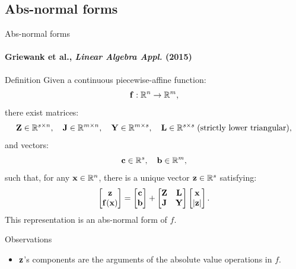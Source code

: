 \documentclass[10pt]{beamer}
\begin{document}
\subsection{Abs-normal forms}
\begin{frame}{Abs-normal forms}
\framesubtitle{Griewank et al., \emph{Linear Algebra Appl.} (2015)}
\begin{block}{Definition}
    Given a continuous piecewise-affine function: %
    \[
        \mathbf{f}:\mathbb{R}^n\to\mathbb{R}^m,
    \]
    there exist matrices:
    \[
    \mathbf{Z}\in\mathbb{R}^{s\times n}, \quad \mathbf{J}\in\mathbb{R}^{m\times n}, \quad
    \mathbf{Y}\in\mathbb{R}^{m\times s}, \quad
    \mathbf{L}\in\mathbb{R}^{s\times s}\; \text{(strictly lower triangular),}
    \] 
    and vectors:
    \[
    \mathbf{c} \in\mathbb{R}^s, \quad \mathbf{b}\in\mathbb{R}^m,
    \]
    such that, for any $\mathbf{x}\in\mathbb{R}^n$, there is a unique vector $\mathbf{z} \in \mathbb{R}^s$ satisfying:
    \[
    \begin{bmatrix}
      \mathbf{z} \\ \mathbf{f}(\mathbf{x})
    \end{bmatrix}
    =
    \begin{bmatrix}
      \mathbf{c} \\ \mathbf{b}
    \end{bmatrix}
    +
    \begin{bmatrix}
      \mathbf{Z} & \mathbf{L} \\ \mathbf{J} & \mathbf{Y}
    \end{bmatrix}
    \begin{bmatrix}
      \mathbf{x} \\ |\mathbf{z}|
    \end{bmatrix}.
    \]
This representation is an abs-normal form of $f$.
\end{block}
\vspace{-3mm}
\begin{block}{Observations}
\vspace{-1mm}
    \begin{itemize}      
        \item $\mathbf{z}$'s components are the arguments of the absolute value operations in $f$.
    \end{itemize}
\end{block}
\end{frame}
\end{document}
